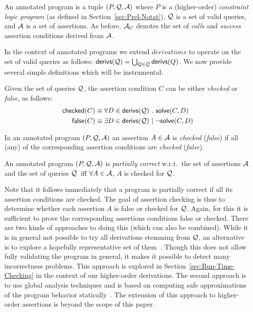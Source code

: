 \documentclass{llncs}
\newcommand{\Q}{\ensuremath{{\cal Q}}}
\newcommand{\A}
  {\ensuremath{{\cal A}}}
\newcommand{\AC}
  {\ensuremath{{\cal A}_{C}}}
\newcommand{\derivations}[1]
  {\ensuremath{\textsf{derivs}(#1)}}
\newcommand{\checkedAsr}[1]{\ensuremath{\textsf{checked}(#1)}}
\newcommand{\falseAsr}[1]{\ensuremath{\textsf{false}(#1)}}
\begin{document}
\begin{definition}
  An annotated program is a tuple $(P,\Q,\A)$ where $P$ is a
  (higher-order) \emph{constraint logic program} (as defined in
  Section~\ref{sec:Prel-Notat}), $\Q$ is a set of valid queries, and
  $\A$ is a set of assertions.  As before, $\AC$ denotes the set of
  \emph{calls} and \emph{success} assertion conditions derived from
  $\A$.
\end{definition}

In the context of annotated programs we extend $derivations$ to
operate on the set of valid queries as follows:
$\derivations{\Q}=\bigcup_{Q\in{\Q}} \derivations{Q}$.
We now provide several simple definitions which will be instrumental:

\begin{definition}
  \label{def:assrts-cond-status}
  Given the set of queries \Q, the assertion condition $C$ can be 
  either \emph{checked} or \emph{false}, as follows:
  \begin{align*}
  \checkedAsr{C} &\equiv \forall D\in \derivations{\Q} ~.~ 
                                             \textsf{solve}(C,D) \\
  \falseAsr{C}   &\equiv \exists D\in \derivations{\Q} ~|~ \neg 
    \textsf{solve}(C,D)
  \end{align*}
\end{definition}
\begin{definition}
  \label{def:assrt-status}
  In an annotated program $(P,\Q,\A)$ an assertion $A \in \A$ is
  \emph{checked} (\emph{false}) if all (any) of the corresponding
  assertion conditions are \emph{checked} (\emph{false}).
\end{definition}
\begin{definition}
An annotated program $(P,\Q,\A)$ is \emph{partially correct} w.r.t.\
  the set of assertions $\A$ and the set of queries \Q~iff
   $\forall A \in \A$, $A$ is checked for \Q.
\end{definition}

\noindent
Note that it follows immediately that a program is partially correct
if all its assertion conditions are checked.
The goal of assertion checking is thus to determine whether each
assertion $A$ is false or checked for $\Q$.  
Again, for this it is sufficient to prove the corresponding assertions
conditions false or checked.
There are two kinds of approaches to doing this (which can also be
combined). 
While it is in general not possible to try all derivations stemming
from $\Q$, an alternative is to explore a hopefully representative set
of them~\cite{testchecks-iclp09}. Though this does not allow fully
validating the program in general, it makes it possible to detect many
incorrectness problems. This approach is explored in
Section~\ref{sec:Run-Time-Checking} in the context of our higher-order
derivations.
The second approach is to use global analysis techniques and is based
on computing safe approximations of the program behavior
statically~\cite{aadebug97-informal-short,ciaopp-sas03-journal-scp-short}. 
The extension of this approach to higher-order assertions is beyond
the scope of this paper.
\end{document}
